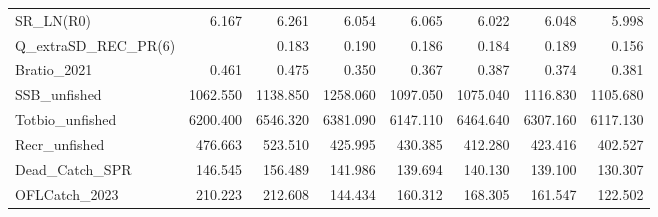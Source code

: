 \documentclass[
  english,
  a4paper,
]{article}
\begin{document}
\begin{table}
{\begin{tabular}[t]{lrrrrrrr}
SR\_LN(R0) & 6.167 & 6.261 & 6.054 & 6.065 & 6.022 & 6.048 & 5.998\\
Q\_extraSD\_REC\_PR(6) &  & 0.183 & 0.190 & 0.186 & 0.184 & 0.189 & 0.156\\
Bratio\_2021 & 0.461 & 0.475 & 0.350 & 0.367 & 0.387 & 0.374 & 0.381\\
SSB\_unfished & 1062.550 & 1138.850 & 1258.060 & 1097.050 & 1075.040 & 1116.830 & 1105.680\\
Totbio\_unfished & 6200.400 & 6546.320 & 6381.090 & 6147.110 & 6464.640 & 6307.160 & 6117.130\\
Recr\_unfished & 476.663 & 523.510 & 425.995 & 430.385 & 412.280 & 423.416 & 402.527\\
Dead\_Catch\_SPR & 146.545 & 156.489 & 141.986 & 139.694 & 140.130 & 139.100 & 130.307\\
OFLCatch\_2023 & 210.223 & 212.608 & 144.434 & 160.312 & 168.305 & 161.547 & 122.502\\
\bottomrule
\end{tabular}}
\end{table}
\end{document}
